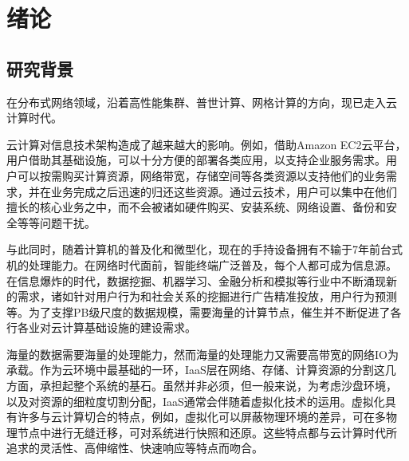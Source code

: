 \documentclass[phd,nobackinfo]{scutthesis}
\begin{document}
\tableofcontents

\listoffigures

\listoftables

\mainmatter

\chapter{绪论}\label{chapter_introduction}
\section{研究背景}

在分布式网络领域，沿着高性能集群、普世计算、网格计算的方向，现已走入云
计算时代。

云计算对信息技术架构造成了越来越大的影响。例如，借助Amazon EC2云平台，
用户借助其基础设施，可以十分方便的部署各类应用，以支持企业服务需求。用
户可以按需购买计算资源，网络带宽，存储空间等各类资源以支持他们的业务需
求，并在业务完成之后迅速的归还这些资源。通过云技术，用户可以集中在他们
擅长的核心业务之中，而不会被诸如硬件购买、安装系统、网络设置、备份和安
全等等问题干扰。

与此同时，随着计算机的普及化和微型化，现在的手持设备拥有不输于7年前台式
机的处理能力。在网络时代面前，智能终端广泛普及，每个人都可成为信息源。
在信息爆炸的时代，数据挖掘、机器学习、金融分析和模拟等行业中不断涌现新
的需求，诸如针对用户行为和社会关系的挖掘进行广告精准投放，用户行为预测
等。为了支撑PB级尺度的数据规模，需要海量的计算节点，催生并不断促进了各
行各业对云计算基础设施的建设需求。

海量的数据需要海量的处理能力，然而海量的处理能力又需要高带宽的网络IO为
承载。作为云环境中最基础的一环，IaaS层在网络、存储、计算资源的分割这几
方面，承担起整个系统的基石。虽然并非必须，但一般来说，为考虑沙盘环境，
以及对资源的细粒度切割分配，IaaS通常会伴随着虚拟化技术的运用。虚拟化具
有许多与云计算切合的特点，例如，虚拟化可以屏蔽物理环境的差异，可在多物
理节点中进行无缝迁移，可对系统进行快照和还原。这些特点都与云计算时代所
追求的灵活性、高伸缩性、快速响应等特点而吻合。
\end{document}
